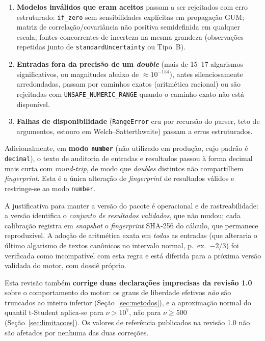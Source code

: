 \documentclass[11pt,a4paper]{article}
\begin{document}
\begin{enumerate}[label=(\alph*)]
  \item \textbf{Modelos inválidos que eram aceitos} passam a ser rejeitados com erro estruturado: \texttt{if\_zero} sem sensibilidades explícitas em propagação GUM; matriz de correlação/covariância não positiva semidefinida em qualquer escala; fontes concorrentes de incerteza na mesma grandeza (observações repetidas junto de \texttt{standardUncertainty} ou Tipo~B).
  \item \textbf{Entradas fora da precisão de um \emph{double}} (mais de 15--17 algarismos significativos, ou magnitudes abaixo de \(\approx 10^{-154}\)), antes silenciosamente arredondadas, passam por caminhos exatos (aritmética racional) ou são rejeitadas com \texttt{UNSAFE\_NUMERIC\_RANGE} quando o caminho exato não está disponível.
  \item \textbf{Falhas de disponibilidade} (\texttt{RangeError} cru por recursão do parser, teto de argumentos, estouro em Welch--Satterthwaite) passam a erros estruturados.
\end{enumerate}

Adicionalmente, em \textbf{modo \texttt{number}} (não utilizado em produção, cujo padrão é \texttt{decimal}), o texto de auditoria de entradas e resultados passou à forma decimal mais curta com \emph{round-trip}, de modo que \emph{doubles} distintos não compartilhem \emph{fingerprint}. Esta é a única alteração de \emph{fingerprint} de resultados válidos e restringe-se ao modo \texttt{number}.

A justificativa para manter a versão do pacote é operacional e de rastreabilidade: a versão identifica o \emph{conjunto de resultados validados}, que não mudou; cada calibração registra em \emph{snapshot} o \emph{fingerprint} SHA-256 do cálculo, que permanece reproduzível. A adoção de aritmética exata em \emph{todas} as entradas (que alteraria o último algarismo de textos canônicos no intervalo normal, p.~ex.\ \(-2/3\)) foi verificada como incompatível com esta regra e está diferida para a próxima versão validada do motor, com dossiê próprio.

Esta revisão também \textbf{corrige duas declarações imprecisas da revisão 1.0} sobre o comportamento do motor: os graus de liberdade efetivos \emph{não} são truncados ao inteiro inferior (Seção~\ref{sec:metodos}), e a aproximação normal do quantil t-Student aplica-se para \(\nu > 10^{7}\), não para \(\nu \geq 500\) (Seção~\ref{sec:limitacoes}). Os valores de referência publicados na revisão 1.0 não são afetados por nenhuma das duas correções.
\end{document}
